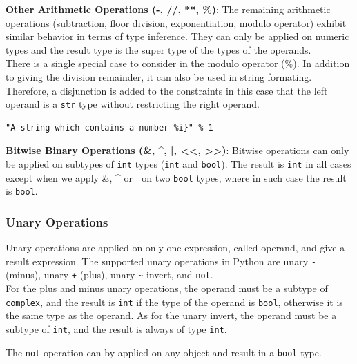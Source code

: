 \textbf{Other Arithmetic Operations (-, //, **, \%)}:
The remaining arithmetic operations (subtraction, floor division, exponentiation, modulo operator) exhibit similar behavior in terms of type inference. They can only be applied on numeric types and the result type is the super type of the types of the operands. \\

There is a single special case to consider in the modulo operator (\%). In addition to giving the division remainder, it can also be used in string formating. Therefore, a disjunction is added to the constraints in this case that the left operand is a \lstinline|str| type without restricting the right operand.

\begin{lstlisting}
"A string which contains a number %i}" % 1
\end{lstlisting}

\textbf{Bitwise Binary Operations (\&, \textrm{\^}, |, <<, >>)}:
Bitwise operations can only be applied on subtypes of \lstinline|int| types (\lstinline|int| and \lstinline|bool|). The result is \lstinline|int| in all cases except when we apply \&, \textrm{\^} or | on two \lstinline|bool| types, where in such case the result is \lstinline|bool|.

\subsubsection{Unary Operations}
Unary operations are applied on only one expression, called operand, and give a result expression. The supported unary operations in Python are unary \lstinline|-| (minus), unary \lstinline|+| (plus), unary \lstinline|~| invert, and \lstinline|not|.\\

For the plus and minus unary operations, the operand must be a subtype of \lstinline|complex|, and the result is \lstinline|int| if the type of the operand is \lstinline|bool|, otherwise it is the same type as the operand. As for the unary invert, the operand must be a subtype of \lstinline|int|, and the result is always of type \lstinline|int|.

The \lstinline|not| operation can by applied on any object and result in a \lstinline|bool| type.


